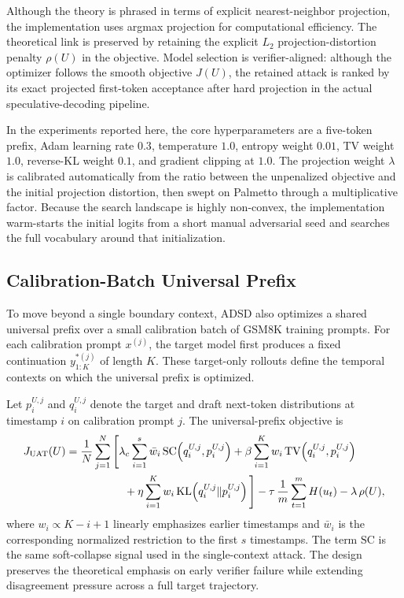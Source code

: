 Although the theory is phrased in terms of explicit nearest-neighbor
projection, the implementation uses argmax projection for computational
efficiency. The theoretical link is preserved by retaining the explicit
$L_2$ projection-distortion penalty $\rho(U)$ in the objective. Model
selection is verifier-aligned: although the optimizer follows the smooth
objective $J(U)$, the retained attack is ranked by its exact projected
first-token acceptance after hard projection in the actual
speculative-decoding pipeline.

In the experiments reported here, the core hyperparameters are a five-token
prefix, Adam learning rate $0.3$, temperature $1.0$, entropy weight $0.01$, TV
weight $1.0$, reverse-KL weight $0.1$, and gradient clipping at $1.0$. The
projection weight $\lambda$ is calibrated automatically from the ratio between
the unpenalized objective and the initial projection distortion, then swept on
Palmetto through a multiplicative factor. Because the search landscape is
highly non-convex, the implementation warm-starts the initial logits from a
short manual adversarial seed and searches the full vocabulary around that
initialization.

\subsection{Calibration-Batch Universal Prefix}

To move beyond a single boundary context, ADSD also optimizes a shared
universal prefix over a small calibration batch of GSM8K training prompts. For
each calibration prompt $x^{(j)}$, the target model first produces a fixed
continuation $y^{*(j)}_{1:K}$ of length $K$. These target-only rollouts define
the temporal contexts on which the universal prefix is optimized.

Let $p_i^{U,j}$ and $q_i^{U,j}$ denote the target and draft next-token
distributions at timestamp $i$ on calibration prompt $j$. The universal-prefix
objective is
\begin{align*}
J_{\mathrm{UAT}}(U) ={}&
\frac{1}{N}\sum_{j=1}^{N}
\Bigg[
\lambda_c \sum_{i=1}^{s} \bar{w}_i\,
\mathrm{SC}\!\left(q_i^{U,j}, p_i^{U,j}\right)
+ \beta \sum_{i=1}^{K} w_i\,\mathrm{TV}\!\left(q_i^{U,j}, p_i^{U,j}\right)
\\
&\qquad\qquad
+ \eta \sum_{i=1}^{K} w_i\,\mathrm{KL}\!\left(q_i^{U,j} \Vert p_i^{U,j}\right)
\Bigg]
- \tau \,\frac{1}{m}\sum_{t=1}^{m} H(u_t)
- \lambda \,\rho(U),
\end{align*}
where $w_i \propto K-i+1$ linearly emphasizes earlier timestamps and
$\bar{w}_i$ is the corresponding normalized restriction to the first $s$
timestamps. The term $\mathrm{SC}$ is the same soft-collapse signal used in the
single-context attack. The design preserves the theoretical emphasis on early
verifier failure while extending disagreement pressure across a full target
trajectory.

